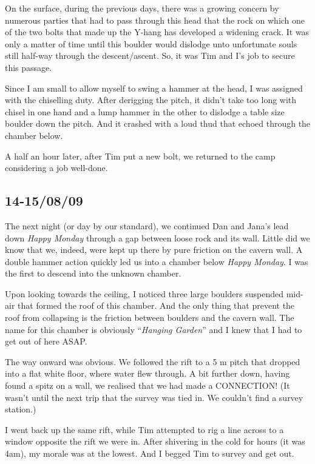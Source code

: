 On the surface, during the previous days, there was a growing concern by
numerous parties that had to pass through this head that the rock on
which one of the two bolts that made up the Y-hang has developed a
widening crack. It was only a matter of time until this boulder would
dislodge unto unfortunate souls still half-way through the
descent/ascent. So, it was Tim and I's job to secure this passage.

Since I am small to allow myself to swing a hammer at the head, I was
assigned with the chiselling duty. After derigging the pitch, it didn't
take too long with chisel in one hand and a lump hammer in the other to
dislodge a table size boulder down the pitch. And it crashed with a loud
thud that echoed through the chamber below.

A half an hour later, after Tim put a new bolt, we returned to the camp
considering a job well-done.


\hypertarget{section-1}{%
\subsection{14-15/08/09}\label{section-1}}

The next night (or day by our standard), we continued Dan and Jana's
lead down \emph{Happy Monday} through a gap between loose rock and its
wall. Little did we know that we, indeed, were kept up there by pure
friction on the cavern wall. A double hammer action quickly led us into
a chamber below \emph{Happy Monday}. I was the first to descend into the
unknown chamber.

Upon looking towards the ceiling, I noticed three large boulders
suspended mid-air that formed the roof of this chamber. And the only
thing that prevent the roof from collapsing is the friction between
boulders and the cavern wall. The name for this chamber is obviously
``\emph{Hanging Garden}'' and I knew that I had to get out of here ASAP.

The way onward was obvious. We followed the rift to a 5 m pitch that
dropped into a flat white floor, where water flew through. A bit further
down, having found a spitz on a wall, we realised that we had made a
CONNECTION! (It wasn't until the next trip that the survey was tied in.
We couldn't find a survey station.)

I went back up the same rift, while Tim attempted to rig a line across
to a window opposite the rift we were in. After shivering in the cold
for hours (it was 4am), my morale was at the lowest. And I begged Tim to
survey and get out.

